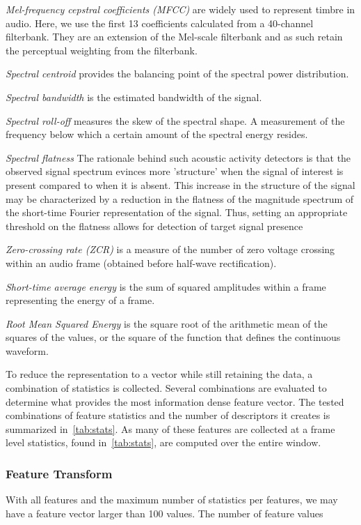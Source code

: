 \textit{Mel-frequency cepstral coefficients (MFCC)} are widely used to represent timbre in audio. Here, we use the first 13 coefficients calculated from a 40-channel filterbank. They are an extension of the Mel-scale filterbank and as such retain the perceptual weighting from the filterbank.

\textit{Spectral centroid} provides the balancing point of the spectral power distribution.

\textit{Spectral bandwidth} is the estimated bandwidth of the signal.

\textit{Spectral roll-off} measures the skew of the spectral shape. A measurement of the frequency below which a certain amount of the spectral energy resides.

\textit{Spectral flatness} The rationale
behind such acoustic activity detectors is that the observed signal
spectrum evinces more 'structure' when the signal of interest is
present compared to when it is absent. This increase in the structure
of the signal may be characterized by a reduction in the flatness of
the magnitude spectrum of the short-time Fourier representation of the
signal. Thus, setting an appropriate threshold on the flatness allows
for detection of target signal presence


\textit{Zero-crossing rate (ZCR)} is a measure of the number of zero voltage crossing within an audio frame (obtained before half-wave rectification).

\textit{Short-time average energy} is the sum of squared amplitudes within a frame representing the energy of a frame.

\textit{Root Mean Squared Energy} is the square root of the arithmetic mean of the squares of the values, or the square of the function that defines the continuous waveform.

To reduce the representation to a vector while still retaining the data, a
combination of statistics is collected. Several combinations are evaluated to determine what provides the most information dense feature vector. The tested combinations of feature statistics and the number of descriptors it creates is summarized in~\cref{tab:stats}.
As many of these features are collected at a frame level statistics, found
in~\cref{tab:stats}, are computed over the entire window.

\subsubsection{Feature Transform}
With all features and the maximum number of statistics per features, we may have a feature vector larger than 100 values. The number of feature values
